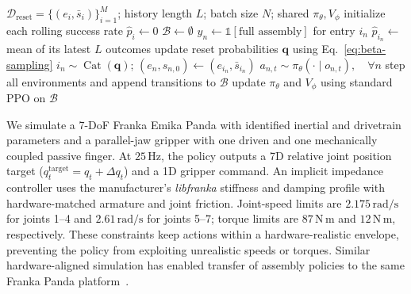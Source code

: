 \begin{algorithm}[t]
    \caption{AlphaNIST Heterogeneous Assembly Learning}
    \label{alg:training}
    \small
    \begin{algorithmic}[1]
        \Require $\mathcal{D}_{\mathrm{reset}}=\{(e_i,\bar{s}_i)\}_{i=1}^{M}$;
        history length $L$; batch size $N$; shared $\pi_\theta,V_\phi$
        \State initialize each rolling success rate $\hat{p}_i\gets0$
            \State $\mathcal{B}\gets\emptyset$
                    \State $y_n\gets\mathbb{1}[\text{full assembly}]$
                    for entry $i_n$
                    \State $\hat{p}_{i_n}\gets$ mean of its latest $L$ outcomes
                \EndFor
                \State update reset probabilities
                $\mathbf q$ using Eq.~\eqref{eq:beta-sampling}
                    \State $i_n\sim\operatorname{Cat}(\mathbf q)$;
                    $(e_n,s_{n,0})\gets(e_{i_n},\bar{s}_{i_n})$
                \EndFor
                \State $a_{n,t}\sim\pi_\theta(\cdot\mid o_{n,t}),\quad\forall n$
                \State step all environments and append transitions to $\mathcal{B}$
            \EndWhile
            \State update $\pi_\theta$ and $V_\phi$ using standard PPO on $\mathcal{B}$
        \EndFor
    \end{algorithmic}
\end{algorithm}




We simulate a 7-DoF Franka Emika Panda with identified inertial and drivetrain
parameters and a parallel-jaw gripper with one driven and one mechanically
coupled passive finger. At $25\,\mathrm{Hz}$, the policy outputs a 7D relative joint position target ($q_t^{\mathrm{target}} = q_t + \Delta q_t$) and a 1D gripper command.
An implicit impedance controller uses the manufacturer's \textit{libfranka} stiffness
and damping profile with
hardware-matched armature and joint friction. Joint-speed limits are $2.175\,\mathrm{rad/s}$ for joints 1--4 and $2.61\,\mathrm{rad/s}$ for joints
5--7; torque limits are $87\,\mathrm{N\,m}$ and $12\,\mathrm{N\,m}$,
respectively. 
These constraints keep actions within a hardware-realistic
envelope, preventing the policy from exploiting unrealistic speeds or
torques. 
Similar hardware-aligned simulation has enabled transfer of
assembly policies to the same Franka Panda
platform~\cite{tang2023industreal,tang2024automate}.


